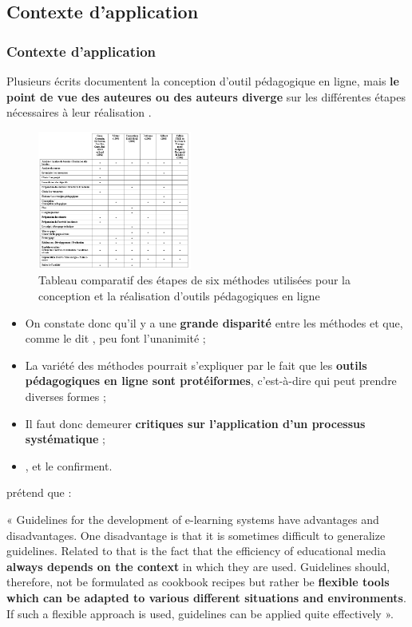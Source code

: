   \subsection{Contexte d'application} 
		\begin{frame}[allowframebreaks]
			\frametitle{Contexte d'application}
			Plusieurs écrits documentent la conception d’outil pédagogique en ligne, mais\textbf{ le point de vue des auteures ou des auteurs diverge} sur les différentes étapes nécessaires à leur réalisation \citep[p.18]{bonneau2013a}.
                   \begin{figure}
                     \centering
                     \includegraphics[width = 0.45\textwidth]{tableau6methodes.png}
                     \caption{\tiny{Tableau comparatif des étapes de six méthodes utilisées pour la conception et la réalisation d’outils pédagogiques en ligne \citep[p.20]{bonneau2013a}}}
                   \end{figure}
                   \begin{itemize}                   
                   \item On constate donc qu’il y a une \textbf{grande disparité} entre les méthodes et que, comme le dit \citet{bonneau2013a}, peu font l’unanimité ;
                   \item La variété des méthodes pourrait s’expliquer par le fait que les \textbf{outils pédagogiques en ligne sont protéiformes}, c’est-à-dire qui peut prendre diverses formes ;
                   \item Il faut donc demeurer\textbf{ critiques sur l’application d’un processus systématique} ;
                   \item \citet[p.10]{retalis1997a}, \citet[p.46]{smith2006a} et \citet[p.3]{pohl2004a} le confirment.
                   \end{itemize}
			\par \citet[p.3]{pohl2004a} prétend que : 
			\par« Guidelines for the development of e-learning systems have advantages and disadvantages. One disadvantage is that it is sometimes difficult to generalize guidelines. Related to that is the fact that the efficiency of educational media \textbf{always depends on the context} in which they are used. Guidelines should, therefore, not be formulated as cookbook recipes but rather be \textbf{flexible tools which can be adapted to various different situations and environments}. If such a flexible approach is used, guidelines can be applied quite effectively ».

\end{frame}
